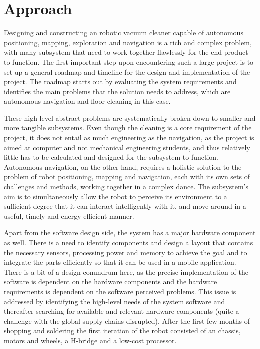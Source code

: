 
\section{Approach}

Designing and constructing an robotic vacuum cleaner capable of autonomous positioning, mapping, exploration and navigation is a rich and complex problem, with many subsystem that need to work together flawlessly for the end product to function. The first important step upon encountering such a large project is to set up a general roadmap and timeline for the design and implementation of the project. The roadmap starts out by evaluating the system requirements and identifies the main problems that the solution needs to address, which are autonomous navigation and floor cleaning in this case. 

These high-level abstract problems are systematically broken down to smaller and more tangible subsystems. Even though the cleaning is a core requirement of the project, it does not entail as much engineering as the navigation, as the project is aimed at computer and not mechanical engineering students, and thus relatively little has to be calculated and designed for the subsystem to function. Autonomous navigation, on the other hand, requires a holistic solution to the problem of robot positioning, mapping and navigation, each with its own sets of challenges and methods, working together in a complex dance. The subsystem's aim is to simultaneously allow the robot to perceive its environment to a sufficient degree that it can interact intelligently with it, and move around in a useful, timely and energy-efficient manner. 

Apart from the software design side, the system has a major hardware component as well. There is a need to identify components and design a layout that contains the necessary sensors, processing power and memory to achieve the goal and to integrate the parts efficiently so that it can be used in a mobile application. There is a bit of a design conundrum here, as the precise implementation of the software is dependent on the hardware components and the hardware requirements is dependent on the software perceived problems. This issue is addressed by identifying the high-level needs of the system software and thereafter searching for available and relevant hardware components (quite a challenge with the global supply chains disrupted). After the first few months of shopping and soldering the first iteration of the robot consisted of an chassis, motors and wheels, a H-bridge and a low-cost processor. 

